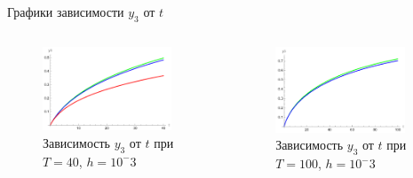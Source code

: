 \documentclass[ignoreonframetext,unicode]{beamer}
\begin{document}
\begin{frame}{Графики зависимости $y_3$ от $t$}
		\begin{columns}
		
		\begin{figure}[!htbp]
			\centering
			\includegraphics[width=0.9\textwidth]{T40-3}%
			\caption{Зависимость $y_3$ от $t$ при $T = 40$, $h = 10^-3$}
			\vspace*{-2mm}
			\label{T40-3}
		\end{figure}
			
		\begin{figure}[!htbp]
			\centering
			\includegraphics[width=0.9\textwidth]{T100-3}%
			\caption{Зависимость $y_3$ от $t$ при $T = 100$, $h = 10^-3$}
			\vspace*{-2mm}
			\label{T100-3}
		\end{figure}
	

\end{columns}
\end{frame}
\end{document}
